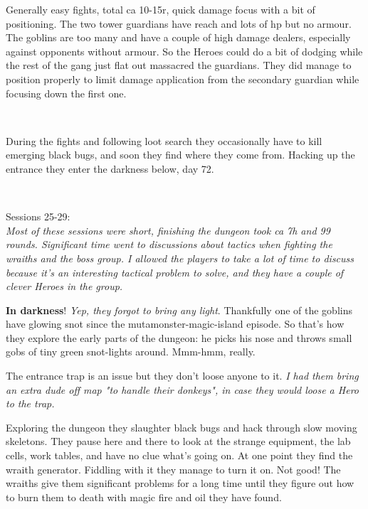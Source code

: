 Generally easy fights, total ca 10-15r, quick damage focus with a bit of positioning. The two tower guardians have reach and lots of hp but no armour. The goblins are too many and have a couple of high damage dealers, especially against opponents without armour. So the Heroes could do a bit of dodging while the rest of the gang just flat out massacred the guardians. They did manage to position properly to limit damage application from the secondary guardian while focusing down the first one.

\

During the fights and following loot search they occasionally have to kill emerging black bugs, and soon they find where they come from. Hacking up the entrance they enter the darkness below, day 72.

\


Sessions 25-29:\\                                                       %
\textit{Most of these sessions were short, finishing the dungeon took ca 7h and 99 rounds. Significant time went to discussions about tactics when fighting the wraiths and the boss group. I allowed the players to take a lot of time to discuss because it's an interesting tactical problem to solve, and they have a couple of clever Heroes in the group.}

\textbf{In darkness}! \emph{Yep, they forgot to bring any light}. Thankfully one of the goblins have glowing snot since the mutamonster-magic-island episode. So that's how they explore the early parts of the dungeon: he picks his nose and throws small gobs of tiny green snot-lights around. Mmm-hmm, really.

The entrance trap is an issue but they don't loose anyone to it. \textit{I had them bring an extra dude off map "to handle their donkeys", in case they would loose a Hero to the trap.}

Exploring the dungeon they slaughter black bugs and hack through slow moving skeletons. They pause here and there to look at the strange equipment, the lab cells, work tables, and have no clue what's going on.
At one point they find the wraith generator. Fiddling with it they manage to turn it on. Not good! The wraiths give them significant problems for a long time until they figure out how to burn them to death with magic fire and oil they have found.

